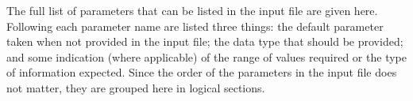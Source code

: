 %
%
%
%
\label{app-param}

The full list of parameters that can be listed in the input file are
given here. Following each parameter name are listed three things: the
default parameter taken when not provided in the input file; the data
type that should be provided; and some indication (where applicable)
of the range of values required or the type of information expected.
Since the order of the parameters in the input file does not matter,
they are grouped here in logical sections.

